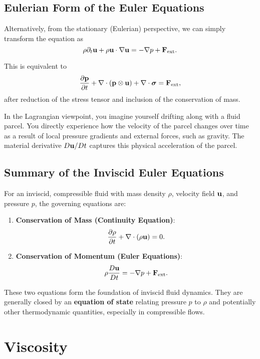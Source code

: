 \subsection*{Eulerian Form of the Euler Equations}

Alternatively, from the stationary (Eulerian) perspective, we can simply transform the equation as
\[
\rho \partial_t {\bf u} + \rho {\bf u}\cdot \nabla {\bf u} = - \nabla p + {\bf F}_{\rm ext}.
\]

This is equivalent to 
\[
\frac{\partial {\bf p}}{\partial t} + \nabla \cdot ({\bf p} \otimes {\bf u}) + \nabla \cdot \boldsymbol{\sigma} = {\bf F}_{\rm ext},
\]
after reduction of the stress tensor and inclusion of the conservation of mass.

\begin{remark}
    In the Lagrangian viewpoint, you imagine yourself drifting along with a fluid parcel. You directly experience how the velocity of the parcel changes over time as a result of local pressure gradients and external forces, such as gravity. The material derivative $D{\bf u}/Dt$ captures this physical acceleration of the parcel.
\end{remark}

\subsection*{Summary of the Inviscid Euler Equations}

For an inviscid, compressible fluid with mass density $\rho$, velocity field ${\bf u}$, and pressure $p$, the governing equations are:

\begin{enumerate}
    \item \textbf{Conservation of Mass (Continuity Equation)}:
    \[
    \frac{\partial \rho}{\partial t} + \nabla \cdot ( \rho {\bf u} ) = 0.
    \]

    \item \textbf{Conservation of Momentum (Euler Equations)}:
    \[
    \rho \frac{D {\bf u}}{D t} = - \nabla p + {\bf F}_{\rm ext}.
    \]
\end{enumerate}

These two equations form the foundation of inviscid fluid dynamics. They are generally closed by an \textbf{equation of state} relating pressure $p$ to $\rho$ and potentially other thermodynamic quantities, especially in compressible flows.

\section{Viscosity}

